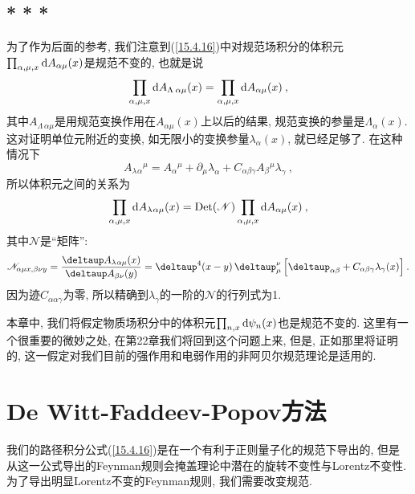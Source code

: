 \subsection*{* * *}

为了作为后面的参考, 我们注意到(\ref{15.4.16})中对规范场积分的体积元$%
\prod_{\alpha ,\mu ,x}\dif A_{\alpha \mu }(x)$是规范不变的, 也就是说\begin{equation}
\prod_{\alpha ,\mu ,x}\mathrm{d} A_{\Lambda\:\alpha\mu}(x)=\prod_{\alpha ,\mu
,x}\mathrm{d} A_{\alpha \mu }(x)\:,   \label{15.4.17}
\end{equation}%
其中$A_{\Lambda \,\alpha\mu}$是用规范变换作用在$A_{\alpha \mu }(x)$上以后的结果, 规范变换的参量是$%
\Lambda _{\alpha }(x)$. 这对证明单位元附近的变换, 如无限小的变换参量$\lambda _{\alpha }(x)$, 就已经足够了.
在这种情况下
\[
A_{\lambda }{}_{\alpha}{}^{\mu}=A_{\alpha }{}^{\mu }+\partial _{\mu }\lambda
_{\alpha }+C_{\alpha \beta \gamma }A_{\beta }{}^{\mu }\lambda _{\gamma }%
\:, 
\]%
所以体积元之间的关系为\[
\prod_{\alpha ,\mu ,x}\dif A_{\lambda }{}_{\alpha\mu}(x)=\operatorname{Det} (\mathscr{N}%
)\prod_{\alpha ,\mu ,x}\dif A_{\alpha \mu }(x)\:, 
\]%
其中$\mathscr{N}$是``矩阵'':%
\[
\mathscr{N}_{\alpha \mu x,\beta \nu y}=\frac{\deltaup A_{\lambda }%
{}_{\alpha\mu}(x)}{\deltaup A_{\beta \nu }(y)}=\deltaup^{4}(x-y)\,\deltaup_{\mu
}^{\nu }\,\Big[ \deltaup_{\alpha \beta }+C_{\alpha \beta \gamma }\lambda
_{\gamma }(x)\Big] \:. 
\]%
因为迹$C_{\alpha \alpha \gamma }$为零, 所以精确到$\lambda _{\gamma }$的一阶的$\mathscr{N}$的行列式为1.

本章中, 我们将假定物质场积分中的体积元$\prod_{n,x}\mathrm{d}\psi _{n}(x)$也是规范不变的. 这里有一个很重要的微妙之处, 在第22章我们将回到这个问题上来, 
但是, 正如那里将证明的, 这一假定对我们目前的强作用和电弱作用的非阿贝尔规范理论是适用的.

\section{De Witt-Faddeev-Popov方法}

我们的路径积分公式(\ref{15.4.16})是在一个有利于正则量子化的规范下导出的, 但是从这一公式导出的Feynman规则会掩盖理论中潜在的旋转不变性与Lorentz不变性. 为了导出明显Lorentz不变的Feynman规则, 我们需要改变规范.

